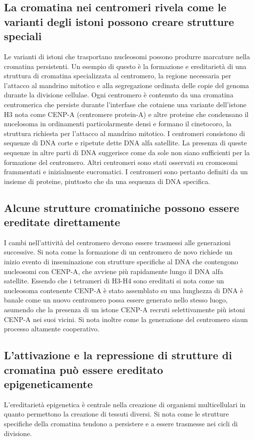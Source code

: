 \subsection{La cromatina nei centromeri rivela come le varianti degli istoni possono creare strutture speciali}
Le varianti di istoni che trasportano nucleosomi possono produrre marcature nella cromatina persistenti. Un esempio di questo \`e la formazione e ereditariet\`a di una struttura di 
cromatina specializzata al centromero, la regione necessaria per l'attacco al mandrino mitotico e alla segregazione ordinata delle copie del genoma durante la divisione cellulae. Ogni
centromero \`e contenuto da una cromatina centromerica che persiste durante l'interfase che cotniene una variante dell'istone H3 nota come CENP-A (centromere protein-A) e altre 
proteine che condensano il nucelosoma in ordinamenti particolarmente densi e formano il cinetocoro, la struttura richiesta per l'attacco al mandrino mitotico. I centromeri consistono 
di sequenze di DNA corte e ripetute dette DNA alfa satellite. La presenza di queste sequenze in altre parti di DNA suggerisce come da sole non siano sufficienti per la formazione 
del centromero. Altri centromeri sono stati osservati su cromosomi frammentati e inizialmente eucromatici. I centromeri sono pertanto definiti da un insieme di proteine, piuttosto che
da una sequenza di DNA specifica. 
\subsection{Alcune strutture cromatiniche possono essere ereditate direttamente}
I cambi nell'attivit\`a del centromero devono essere trasmessi alle generazioni successive. Si nota come la formazione di un centromero de novo richiede un inizio evento di 
inseminazione con strutture specifiche al DNA che contengono nucleosomi con CENP-A, che avviene pi\`u rapidamente lungo il DNA alfa satellite. Essendo che i tetrameri di H3-H4 sono
ereditati si nota come un nucleosoma contenente CENP-A \`e stato assemblato su una lunghezza di DNA \`e banale come un nuovo centromero possa essere generato nello stesso luogo, 
asumendo che la presenza di un istone CENP-A recruti selettivamente pi\`u istoni CENP-A nei suoi vicini. Si nota inoltre come la generazione del centromero siaun processo altamente 
cooperativo.
\subsection{L'attivazione e la repressione di strutture di cromatina pu\`o essere ereditato epigeneticamente}
L'ereditariet\`a epigenetica \`e centrale nella creazione di organismi multicellulari in quanto permettono la creazione di tessuti diversi. Si nota come le strutture specifiche della
cromatina tendono a persistere e a essere trasmesse nei cicli di divisione.
